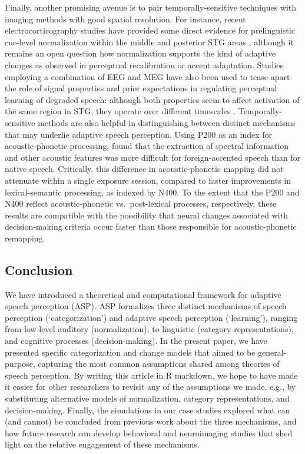 \documentclass[
  11pt,
  man,floatsintext]{apa6}
\begin{document}
Finally, another promising avenue is to pair temporally-sensitive techniques with imaging methods with good spatial resolution. For instance, recent electrocorticography studies have provided some direct evidence for prelinguistic cue-level normalization within the middle and posterior STG areas \autocites{johnson-sjerps2021,tang2017}[see also][]{sjerps2019}, although it remains an open question how normalization supports the kind of adaptive changes as observed in perceptual recalibration or accent adaptation. Studies employing a combination of EEG and MEG have also been used to tease apart the role of signal properties and prior expectations in regulating perceptual learning of degraded speech: although both properties seem to affect activation of the same region in STG, they operate over different timescales \autocite{sohoglu-davis2016,sohoglu-davis2020}. Temporally-sensitive methods are also helpful in distinguishing between distinct mechanisms that may underlie adaptive speech perception. Using P200 as an index for acoustic-phonetic processing, \textcite{romero2015} found that the extraction of spectral information and other acoustic features was more difficult for foreign-accented speech than for native speech. Critically, this difference in acoustic-phonetic mapping did not attenuate within a single exposure session, compared to faster improvements in lexical-semantic processing, as indexed by N400. To the extent that the P200 and N400 reflect acoustic-phonetic vs.~post-lexical processes, respectively, these results are compatible with the possibility that neural changes associated with decision-making criteria \autocites[driven by the prediction error experienced during lexical processing, cf.][]{delaney2019,kuperberg2016} occur faster than those responsible for acoustic-phonetic remapping.

\hypertarget{conclusion}{%
\subsection{Conclusion}\label{conclusion}}

We have introduced a theoretical and computational framework for adaptive speech perception (ASP). ASP formalizes three distinct mechanisms of speech perception (`categorization') and adaptive speech perception (`learning'), ranging from low-level auditory (normalization), to linguistic (category representations), and cognitive processes (decision-making). In the present paper, we have presented specific categorization and change models that aimed to be general-purpose, capturing the most common assumptions shared among theories of speech perception. By writing this article in R markdown, we hope to have made it easier for other researchers to revisit any of the assumptions we made, e.g., by substituting alternative models of normalization, category representations, and decision-making. Finally, the simulations in our case studies explored what can (and cannot) be concluded from previous work about the three mechanisms, and how future research can develop behavioral and neuroimaging studies that shed light on the relative engagement of these mechanisms.
\end{document}

